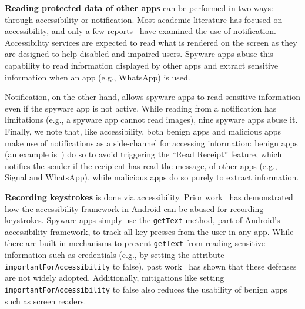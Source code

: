\textbf{Reading protected data of other apps} can be performed in two ways: through
accessibility or notification. Most academic literature has focused on
accessibility, and only a few reports~\cite{VB2019Za6:online} have examined the
use of notification. Accessibility services are expected to read what is
rendered on the screen as they are designed to help disabled and impaired users.
Spyware apps abuse this capability to read information displayed by other apps
and extract sensitive information when an app (e.g., WhatsApp) is used.

Notification, on the other hand, allows spyware apps to read sensitive
information even if the spyware app is not active. While reading from a notification has
limitations (e.g., a spyware app cannot read images), nine spyware apps abuse it.
Finally, we note that, like accessibility, both benign apps and malicious apps
make use of notifications as a side-channel for accessing information: benign
apps (an example is~\cite{ReadUnre55:online}) do so to avoid triggering the ``Read Receipt'' feature, which notifies the
sender if the recipient has read the message,
of other apps (e.g., Signal and WhatsApp), while malicious apps do so
purely to extract information.

\textbf{Recording keystrokes} is done via accessibility. Prior
work~\cite{fratantonio2017cloak,jang2014a11y,naseri2019accessileaks} has
demonstrated how the accessibility framework in Android can be abused for
recording keystrokes.
Spyware apps simply use the \texttt{getText} method, part
of Android's accessibility framework, to track all key presses from the user in
any app.
While there are built-in mechanisms to prevent \texttt{getText} from
reading sensitive information such as credentials (e.g., by setting
the attribute
\texttt{importantForAccessibility} to false), past
work~\cite{naseri2019accessileaks} has shown that these defenses are not
widely adopted. Additionally, mitigations like setting \texttt{importantForAccessibility} to
false also reduces the usability of benign apps such as screen readers.


